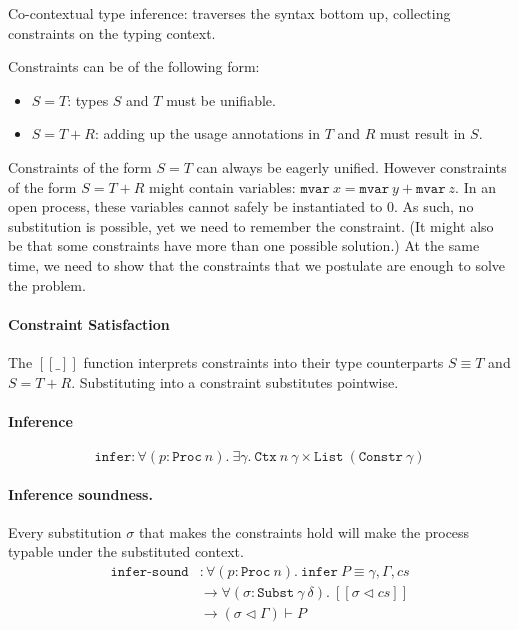 \documentclass[sigplan,screen,review]{acmart}
\begin{document}
Co-contextual type inference: traverses the syntax bottom up, collecting
constraints on the typing context.

Constraints can be of the following form:

\begin{itemize}
\item
  \(S = T\): types \(S\) and \(T\) must be unifiable.
\item
  \(S = T + R\): adding up the usage annotations in \(T\) and \(R\) must
  result in \(S\).
\end{itemize}

Constraints of the form \(S = T\) can always be eagerly unified. However
constraints of the form \(S = T + R\) might contain variables:
\(\texttt{mvar}~x = \texttt{mvar}~y + \texttt{mvar}~z\). In an open
process, these variables cannot safely be instantiated to \(0\). As
such, no substitution is possible, yet we need to remember the
constraint. (It might also be that some constraints have more than one
possible solution.) At the same time, we need to show that the
constraints that we postulate are enough to solve the problem.

\paragraph{Constraint Satisfaction}

The \([\![\_]\!]\) function interprets constraints into their type
counterparts \(S \equiv T\) and \(S = T + R\). Substituting into a
constraint substitutes pointwise.

\paragraph{Inference}

\[
\texttt{infer} : \forall (p : \texttt{Proc}~n). ~ \exists \gamma. ~ \texttt{Ctx}~n~\gamma \times \texttt{List}~(\texttt{Constr}~\gamma)
\]

\paragraph{Inference soundness.}

Every substitution \(\sigma\) that makes the constraints hold will make
the process typable under the substituted context. \[
\begin{aligned}
\texttt{infer-sound} &: \forall (p : \texttt{Proc}~n). ~ \texttt{infer}~P \equiv \gamma , \Gamma , cs \\
&\to \forall (\sigma : \texttt{Subst}~\gamma~\delta). ~ [\![ \sigma \triangleleft cs ]\!] \\
&\to (\sigma \triangleleft \Gamma) \vdash P
\end{aligned}
\]
\end{document}
